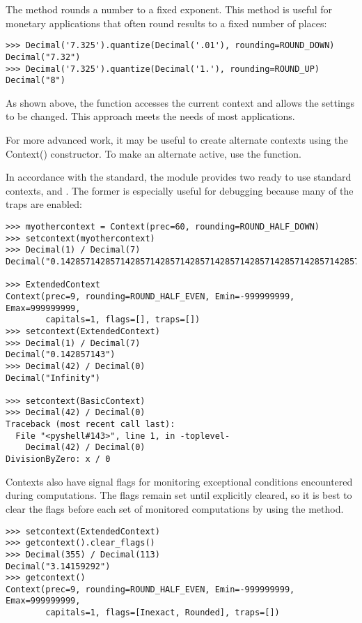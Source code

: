 The  method rounds a number to a fixed exponent.  This
method is useful for monetary applications that often round results to a fixed
number of places:

\begin{verbatim} 
>>> Decimal('7.325').quantize(Decimal('.01'), rounding=ROUND_DOWN)
Decimal("7.32")
>>> Decimal('7.325').quantize(Decimal('1.'), rounding=ROUND_UP)
Decimal("8")
\end{verbatim}

As shown above, the  function accesses the current
context and allows the settings to be changed.  This approach meets the
needs of most applications.

For more advanced work, it may be useful to create alternate contexts using
the Context() constructor.  To make an alternate active, use the
 function.

In accordance with the standard, the  module provides two
ready to use standard contexts,  and
. The former is especially useful for debugging
because many of the traps are enabled:

\begin{verbatim}
>>> myothercontext = Context(prec=60, rounding=ROUND_HALF_DOWN)
>>> setcontext(myothercontext)
>>> Decimal(1) / Decimal(7)
Decimal("0.142857142857142857142857142857142857142857142857142857142857")

>>> ExtendedContext
Context(prec=9, rounding=ROUND_HALF_EVEN, Emin=-999999999, Emax=999999999,
        capitals=1, flags=[], traps=[])
>>> setcontext(ExtendedContext)
>>> Decimal(1) / Decimal(7)
Decimal("0.142857143")
>>> Decimal(42) / Decimal(0)
Decimal("Infinity")

>>> setcontext(BasicContext)
>>> Decimal(42) / Decimal(0)
Traceback (most recent call last):
  File "<pyshell#143>", line 1, in -toplevel-
    Decimal(42) / Decimal(0)
DivisionByZero: x / 0
\end{verbatim}


Contexts also have signal flags for monitoring exceptional conditions
encountered during computations.  The flags remain set until explicitly
cleared, so it is best to clear the flags before each set of monitored
computations by using the  method.

\begin{verbatim}
>>> setcontext(ExtendedContext)
>>> getcontext().clear_flags()
>>> Decimal(355) / Decimal(113)
Decimal("3.14159292")
>>> getcontext()
Context(prec=9, rounding=ROUND_HALF_EVEN, Emin=-999999999, Emax=999999999,
        capitals=1, flags=[Inexact, Rounded], traps=[])
\end{verbatim}

